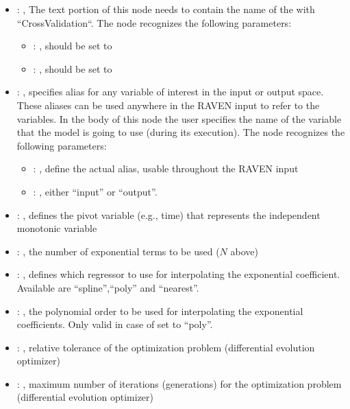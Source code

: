 \begin{itemize}
    \item {}: , 
      The text portion of this node needs to contain the name of the  with
               ``CrossValidation``.
      The  node recognizes the following parameters:
        \begin{itemize}
          \item {}: , 
            should be set to 
          \item {}: , 
            should be set to 
      \end{itemize}

    \item {}: , 
      specifies alias for         any variable of interest in the input or output space. These
      aliases can be used anywhere in the RAVEN input to         refer to the variables. In the body
      of this node the user specifies the name of the variable that the model is going to use
      (during its execution).
      The  node recognizes the following parameters:
        \begin{itemize}
          \item {}: , 
            define the actual alias, usable throughout the RAVEN input
          \item {}: , 
            either ``input'' or ``output''.
      \end{itemize}

    \item {}: , 
      defines the pivot variable (e.g., time) that represents the
      independent monotonic variable

    \item {}: , 
      the number of exponential terms to be used ($N$ above)

    \item {}: , 
      defines which regressor to use for interpolating the
      exponential coefficient. Available are ``spline'',``poly'' and ``nearest''.

    \item {}: , 
      the polynomial order to be used for interpolating the exponential
      coefficients. Only valid in case of   set to ``poly''.

    \item {}: , 
      relative tolerance of the optimization problem (differential evolution optimizer)

    \item {}: , 
      maximum number of iterations (generations) for the
      optimization problem  (differential evolution optimizer)
  \end{itemize}

